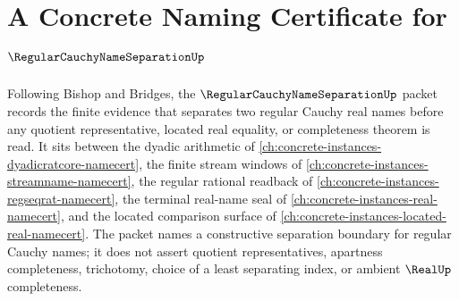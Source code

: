 \chapter{A Concrete Naming Certificate for $\RegularCauchyNameSeparationUp$}
\label{ch:concrete-instances-regular-cauchy-name-separation-namecert}

Following Bishop and Bridges, the $\RegularCauchyNameSeparationUp$ packet records the finite evidence that separates two regular Cauchy real names before any quotient representative, located real equality, or completeness theorem is read. It sits between the dyadic arithmetic of \autoref{ch:concrete-instances-dyadicratcore-namecert}, the finite stream windows of \autoref{ch:concrete-instances-streamname-namecert}, the regular rational readback of \autoref{ch:concrete-instances-regseqrat-namecert}, the terminal real-name seal of \autoref{ch:concrete-instances-real-namecert}, and the located comparison surface of \autoref{ch:concrete-instances-located-real-namecert}. The packet names a constructive separation boundary for regular Cauchy names; it does not assert quotient representatives, apartness completeness, trichotomy, choice of a least separating index, or ambient $\RealUp$ completeness.

